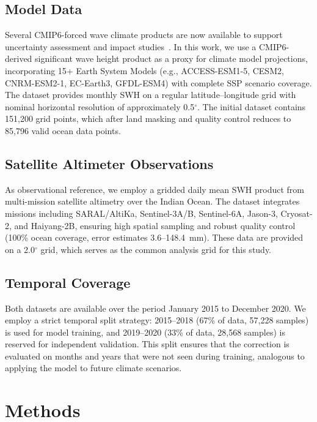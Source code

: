 \documentclass[conference]{IEEEtran}
\begin{document}
\subsection{Model Data}
Several CMIP6-forced wave climate products are now available to support uncertainty assessment and impact studies~\cite{patra2023,meucci2024}. In this work, we use a CMIP6-derived significant wave height product as a proxy for climate model projections, incorporating 15+ Earth System Models (e.g., ACCESS-ESM1-5, CESM2, CNRM-ESM2-1, EC-Earth3, GFDL-ESM4) with complete SSP scenario coverage. The dataset provides monthly SWH on a regular latitude--longitude grid with nominal horizontal resolution of approximately 0.5$^{\circ}$. The initial dataset contains 151,200 grid points, which after land masking and quality control reduces to 85,796 valid ocean data points.

\subsection{Satellite Altimeter Observations}
As observational reference, we employ a gridded daily mean SWH product from multi-mission satellite altimetry over the Indian Ocean. The dataset integrates missions including SARAL/AltiKa, Sentinel-3A/B, Sentinel-6A, Jason-3, Cryosat-2, and Haiyang-2B, ensuring high spatial sampling and robust quality control (100\% ocean coverage, error estimates 3.6--148.4~mm). These data are provided on a 2.0$^{\circ}$ grid, which serves as the common analysis grid for this study.

\subsection{Temporal Coverage}
Both datasets are available over the period January 2015 to December 2020. We employ a strict temporal split strategy: 2015--2018 (67\% of data, 57,228 samples) is used for model training, and 2019--2020 (33\% of data, 28,568 samples) is reserved for independent validation. This split ensures that the correction is evaluated on months and years that were not seen during training, analogous to applying the model to future climate scenarios.

\section{Methods}
\end{document}
